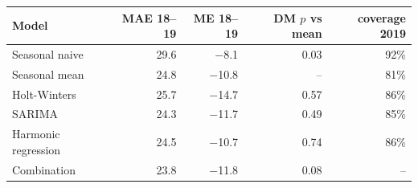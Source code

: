 \begin{tabular}{|l|r|r|r|r|}
\hline
\textbf{Model} & \textbf{MAE 18--19} & \textbf{ME 18--19} & \textbf{DM $p$ vs mean} & \textbf{coverage 2019} \\\hline
Seasonal naive & 29.6 & \ensuremath{-}8.1 & 0.03 & 92\% \\\hline
Seasonal mean & 24.8 & \ensuremath{-}10.8 & -- & 81\% \\\hline
Holt-Winters & 25.7 & \ensuremath{-}14.7 & 0.57 & 86\% \\\hline
SARIMA & 24.3 & \ensuremath{-}11.7 & 0.49 & 85\% \\\hline
Harmonic regression & 24.5 & \ensuremath{-}10.7 & 0.74 & 86\% \\\hline
Combination & 23.8 & \ensuremath{-}11.8 & 0.08 & -- \\\hline
\end{tabular}
